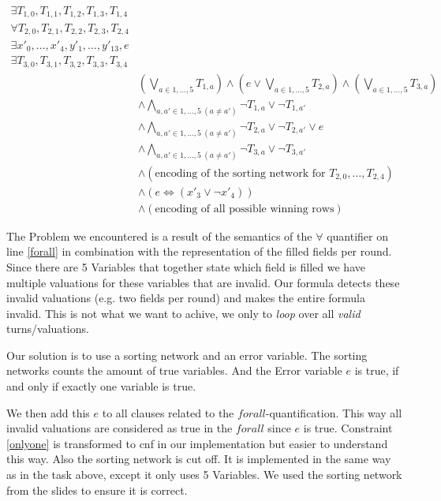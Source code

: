 \documentclass{base}
\begin{document}
\begin{align}
    \exists T_{1,0}, T_{1,1}, T_{1,2}, T_{1,3}, T_{1,4}   \\
    \forall T_{2,0}, T_{2,1}, T_{2,2}, T_{2,3}, T_{2,4}   \label{forall} \\
    \exists x'_0, \dots, x'_4, y'_1,\dots,y'_{13},e  \\
    \exists T_{3,0}, T_{3,1}, T_{3,2}, T_{3,3}, T_{3,4} \\
    & \left(\bigvee_{a \in {1,\dots, 5}} T_{1, a} \right)
    \land \left( e \lor \bigvee_{a \in {1,\dots, 5}} T_{2, a} \right)
    \land \left( \bigvee_{a \in {1,\dots, 5}} T_{3, a} \right) \\
    &\land \bigwedge_{a,a' \in {1,\dots, 5}\ (a\neq a')} \neg T_{1,a} \lor \neg T_{1,a'} \\ 
    &\land \bigwedge_{a,a' \in {1,\dots, 5}\ (a\neq a')} \neg T_{2,a} \lor \neg T_{2,a'} \lor e  \\
    &\land \bigwedge_{a,a' \in {1,\dots, 5}\ (a\neq a')} \neg T_{3,a} \lor \neg T_{3,a'} \\
    &\land (\text{encoding of the sorting network for } T_{2,0},\dots,T_{2,4}) \\
    &\land (e \Leftrightarrow (x'_3 \lor \neg x'_4)) \label{onlyone}\\
    &\land (\text{encoding of all possible winning rows})
\end{align}

The Problem we encountered is a result of the semantics of the $\forall$ quantifier on line \ref{forall} in combination with the representation of the filled fields per round. Since there are 5 Variables that together state which field is filled we have multiple valuations for these variables that are invalid. Our formula detects these invalid valuations (e.g. two fields per round) and makes the entire formula invalid.
This is not what we want to achive, we only to \textit{loop} over all \textit{valid} turns/valuations.

Our solution is to use a sorting network and an error variable. The sorting networks counts the amount of true variables. And the Error variable $e$ is true, if and only if exactly one variable is true.

We then add this $e$ to all clauses related to the $forall$-quantification. This way all invalid valuations are considered as true in the $forall$ since $e$ is true.
Constraint \ref{onlyone} is transformed to cnf in our implementation but easier to understand this way.
Also the sorting network is cut off. It is implemented in the same way as in the task above, except it only uses 5 Variables. We used the sorting network from the slides to ensure it is correct.
\end{document}
